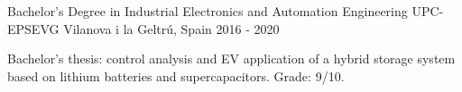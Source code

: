 \cventry
  {Bachelor's Degree in Industrial Electronics and Automation Engineering}
  {UPC-EPSEVG}
  {Vilanova i la Geltr\'u, Spain}
  {2016 - 2020}
  {
    \begin{cvitems}
      \item {Bachelor's thesis: control analysis and EV application of a hybrid storage system based on lithium batteries and supercapacitors. Grade: 9/10.}
    \end{cvitems}
  }
